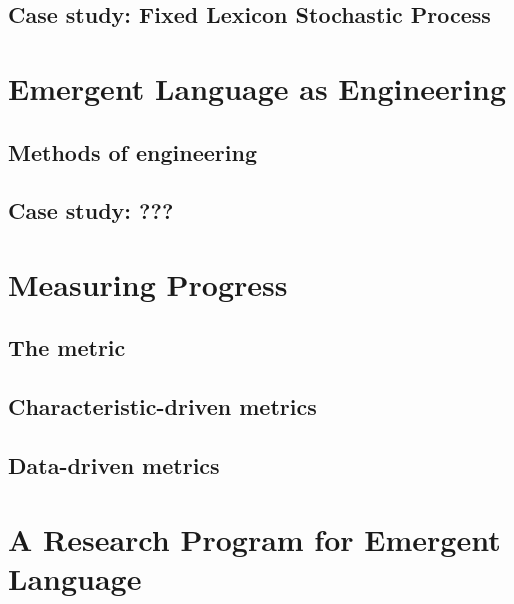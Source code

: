 \documentclass[letterpaper]{report}
\begin{document}
\section{Case study: Fixed Lexicon Stochastic Process}

\chapter{Emergent Language as Engineering}
\section{Methods of engineering}
\section{Case study: ???}

\chapter{Measuring Progress}
\section{The metric}
\section{Characteristic-driven metrics}
\section{Data-driven metrics}

\chapter{A Research Program for Emergent Language}
\end{document}
